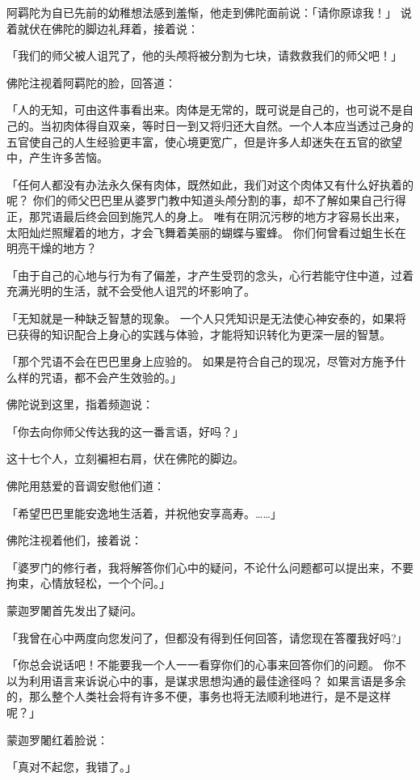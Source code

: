 \documentclass[twoside,openany]{book}
\begin{document}
阿羁陀为自已先前的幼稚想法感到羞惭，他走到佛陀面前说：「请你原谅我！」
说着就伏在佛陀的脚边礼拜着，接着说：

「我们的师父被人诅咒了，他的头颅将被分割为七块，请救救我们的师父吧！」

佛陀注视着阿羁陀的脸，回答道：

「人的无知，可由这件事看出来。肉体是无常的，既可说是自己的，也可说不是自己的。当初肉体得自双亲，等时日一到又将归还大自然。一个人本应当透过己身的五官使自己的人生经验更丰富，使心境更宽广，但是许多人却迷失在五官的欲望中，产生许多苦恼。

「任何人都没有办法永久保有肉体，既然如此，我们对这个肉体又有什么好执着的呢？
你们的师父巴巴里从婆罗门教中知道头颅分割的事，却不了解如果自己行得正，那咒语最后终会回到施咒人的身上。
唯有在阴沉污秽的地方才容易长出来，太阳灿烂照耀着的地方，才会飞舞着美丽的蝴蝶与蜜蜂。
你们何曾看过蛆生长在明亮干燥的地方？

「由于自己的心地与行为有了偏差，才产生受罚的念头，心行若能守住中道，过着充满光明的生活，就不会受他人诅咒的坏影响了。

「无知就是一种缺乏智慧的现象。
一个人只凭知识是无法使心神安泰的，如果将已获得的知识配合上身心的实践与体验，才能将知识转化为更深一层的智慧。

「那个咒语不会在巴巴里身上应验的。
如果是符合自己的现况，尽管对方施予什么样的咒语，都不会产生效验的。」

佛陀说到这里，指着频迦说：

「你去向你师父传达我的这一番言语，好吗？」

这十七个人，立刻褊袒右肩，伏在佛陀的脚边。

佛陀用慈爱的音调安慰他们道：

「希望巴巴里能安逸地生活着，并祝他安享高寿。……」

佛陀注视着他们，接着说：

「婆罗门的修行者，我将解答你们心中的疑问，不论什么问题都可以提出来，不要拘束，心情放轻松，一个个问。」

蒙迦罗闍首先发出了疑问。

「我曾在心中两度向您发问了，但都没有得到任何回答，请您现在答覆我好吗?」

「你总会说话吧！不能要我一个人一一看穿你们的心事来回答你们的问题。
你不以为利用语言来诉说心中的事，是谋求思想沟通的最佳途径吗？
如果言语是多余的，那么整个人类社会将有许多不便，事务也将无法顺利地进行，是不是这样呢？」

蒙迦罗闍红着脸说：

「真对不起您，我错了。」
\end{document}
